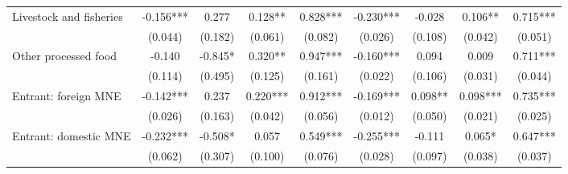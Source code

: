 \begin{tabular}{l*{8}{c}}
Livestock and fisheries & -0.156*** & 0.277 & 0.128** & 0.828*** & -0.230*** & -0.028 & 0.106** & 0.715*** \\
 & (0.044) & (0.182) & (0.061) & (0.082) & (0.026) & (0.108) & (0.042) & (0.051) \\
Other processed food & -0.140 & -0.845* & 0.320** & 0.947*** & -0.160*** & 0.094 & 0.009 & 0.711*** \\
 & (0.114) & (0.495) & (0.125) & (0.161) & (0.022) & (0.106) & (0.031) & (0.044) \\
Entrant: foreign MNE & -0.142*** & 0.237 & 0.220*** & 0.912*** & -0.169*** & 0.098** & 0.098*** & 0.735*** \\
 & (0.026) & (0.163) & (0.042) & (0.056) & (0.012) & (0.050) & (0.021) & (0.025) \\
Entrant: domestic MNE & -0.232*** & -0.508* & 0.057 & 0.549*** & -0.255*** & -0.111 & 0.065* & 0.647*** \\
 & (0.062) & (0.307) & (0.100) & (0.076) & (0.028) & (0.097) & (0.038) & (0.037) \\
\bottomrule
\end{tabular}
